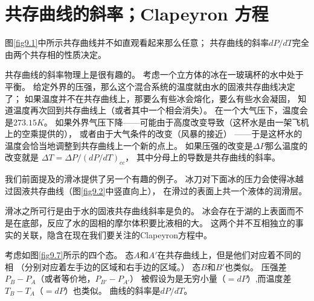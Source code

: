 \section{共存曲线的斜率；Clapeyron 方程}
\label{sec9.3}

图\ref{fig9.1}中所示共存曲线并不如直观看起来那么任意；
共存曲线的斜率$dP/dT$完全由两个共存相的性质决定。

共存曲线的斜率物理上是很有趣的。
考虑一个立方体的冰在一玻璃杯的水中处于平衡。
给定外界的压强，那么这个混合系统的温度就由水的固液共存曲线决定了；
如果温度并不在共存曲线上，那要么有些冰会熔化，要么有些水会凝固，
知道温度再次回到共存曲线上（或者其中一个相会消失）。
在一个大气压下，温度会是$273.15K$。
如果外界气压下降——可能由于高度改变导致（这杯水是由一架飞机上的空乘提供的），
或者由于大气条件的改变（风暴的接近）
——于是这杯水的温度会恰当地调整到共存曲线上一个新的点上。
如果压强的改变是$\Delta P$那么温度的改变就是
$\Delta T=\Delta P/(dP/dT)_{cc}$，
其中分母上的导数是共存曲线的斜率。

我们前面提及的滑冰提供了另一个有趣的例子。
冰刀对下面冰的压力会使得冰越过固液共存曲线（图\ref{fig9.2}中竖直向上），
在滑过的表面上共一个液体的润滑层。

滑冰之所可行是由于水的固液共存曲线斜率是负的。
冰会存在于湖的上表面而不是在底部，反应了水的固相的摩尔体积要比液相的大。
这两个并不互相独立的事实的关联，隐含在现在我们要关注的Clapeyron方程中。

考虑如图\ref{fig9.7}所示的四个态。
态$A$和$A'$在共存曲线上，但是他们对应着不同的相
（分别对应着左手边的区域和右手边的区域。）
态$B$和$B'$也类似。
压强差$P_B-P_A$（或者等价地，$P_{B'}-P_{A'}$）
被假设为是无穷小量（$=dP$）,而温度差$T_B-T_A$（$=dP$）也类似。
曲线的斜率是$dP/dT$。

